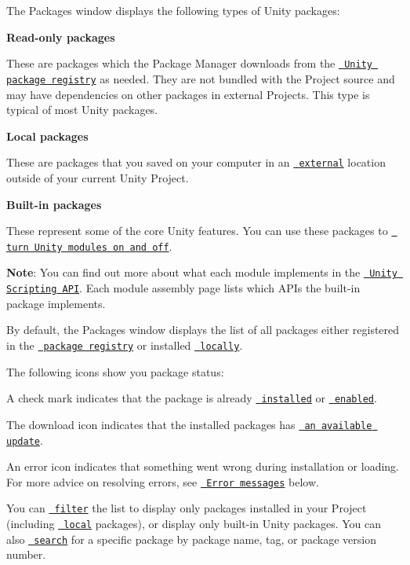 The Packages window displays the following types of Unity packages\+:


\begin{DoxyItemize}
\item {\bfseries{Read-\/only packages}}

These are packages which the Package Manager downloads from the \href{\#PackManRegistry}{\texttt{ Unity package registry}} as needed. They are not bundled with the Project source and may have dependencies on other packages in external Projects. This type is typical of most Unity packages.
\item {\bfseries{Local packages}}

These are packages that you saved on your computer in an \href{\#extpkg}{\texttt{ external}} location outside of your current Unity Project.
\item {\bfseries{Built-\/in packages}}

These represent some of the core Unity features. You can use these packages to \href{\#PackManDisable}{\texttt{ turn Unity modules on and off}}.
\end{DoxyItemize}

{\bfseries{Note}}\+: You can find out more about what each module implements in the \href{https://docs.unity3d.com/ScriptReference/}{\texttt{ Unity Scripting A\+PI}}. Each module assembly page lists which A\+P\+Is the built-\/in package implements.

By default, the Packages window displays the list of all packages either registered in the \href{\#PackManRegistry}{\texttt{ package registry}} or installed \href{\#extpkg}{\texttt{ locally}}.

The following icons show you package status\+:

 A check mark indicates that the package is already \href{\#PackManInstall}{\texttt{ installed}} or \href{\#PackManDisable}{\texttt{ enabled}}.

 The download icon indicates that the installed packages has \href{\#PackManUpdate}{\texttt{ an available update}}.

 An error icon indicates that something went wrong during installation or loading. For more advice on resolving errors, see \href{\#troubleshooting}{\texttt{ Error messages}} below.

You can \href{\#scope}{\texttt{ filter}} the list to display only packages installed in your Project (including \href{\#extpkg}{\texttt{ local}} packages), or display only built-\/in Unity packages. You can also \href{\#searchText}{\texttt{ search}} for a specific package by package name, tag, or package version number.

